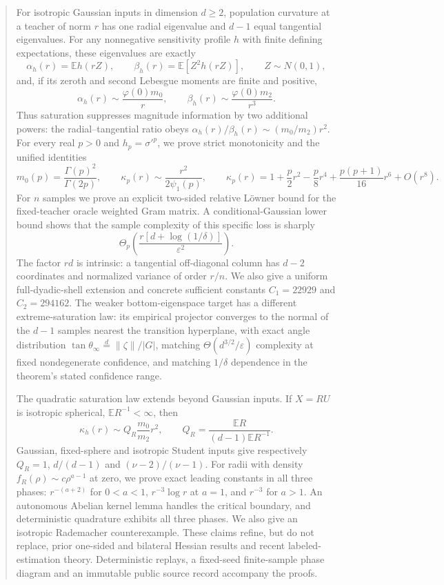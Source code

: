 \documentclass[11pt]{article}
\newcommand{\E}{\mathbb E}
\begin{document}
\begin{abstract}
For isotropic Gaussian inputs in dimension $d\ge2$, population curvature at a teacher of norm $r$ has one radial
eigenvalue and $d-1$ equal tangential eigenvalues.  For any nonnegative sensitivity profile $h$ with finite defining expectations, these
eigenvalues are exactly
\[
 \alpha_h(r)=\E h(rZ),\qquad \beta_h(r)=\E[Z^2h(rZ)],\qquad Z\sim N(0,1),
\]
and, if its zeroth and second Lebesgue moments are finite and positive,
\[
 \alpha_h(r)\sim \frac{\varphi(0)m_0}{r},\qquad
 \beta_h(r)\sim \frac{\varphi(0)m_2}{r^3}.
\]
Thus saturation suppresses magnitude information by two additional powers: the radial--tangential ratio obeys
$\alpha_h(r)/\beta_h(r)\sim(m_0/m_2)r^2$.  For every real $p>0$ and
$h_p=\sigma'^p$, we prove strict monotonicity and the unified identities
\[
 m_0(p)=\frac{\Gamma(p)^2}{\Gamma(2p)},\qquad
 \kappa_p(r)\sim\frac{r^2}{2\psi_1(p)},\qquad
 \kappa_p(r)=1+\frac p2r^2-\frac p8r^4+\frac{p(p+1)}{16}r^6+O(r^8).
\]
For $n$ samples we prove an explicit two-sided relative L\"owner bound for the fixed-teacher oracle weighted
Gram matrix.  A conditional-Gaussian lower bound shows that the sample complexity of this specific loss is sharply
\[
 \Theta_p\!\left(\frac{r[d+\log(1/\delta)]}{\varepsilon^2}\right).
\]
The factor $rd$ is intrinsic: a tangential off-diagonal column has $d-2$ coordinates and normalized variance of
order $r/n$.  We also give a uniform full-dyadic-shell extension and concrete sufficient constants
$C_1=22929$ and $C_2=294162$.  The weaker bottom-eigenspace target has a different extreme-saturation law:
its empirical projector converges to the normal of the $d-1$ samples nearest the transition hyperplane, with exact
angle distribution $\tan\theta_\infty\stackrel d=\lVert\zeta\rVert/|G|$, matching
$\Theta(d^{3/2}/\varepsilon)$ complexity at fixed nondegenerate confidence, and matching $1/\delta$ dependence
in the theorem's stated confidence range.

The quadratic saturation law extends beyond Gaussian inputs.  If $X=RU$ is isotropic spherical,
$\E R^{-1}<\infty$, then
\[
 \kappa_h(r)\sim Q_R\frac{m_0}{m_2}r^2,\qquad
 Q_R=\frac{\E R}{(d-1)\E R^{-1}}.
\]
Gaussian, fixed-sphere and isotropic Student inputs give respectively $Q_R=1$, $d/(d-1)$ and
$(\nu-2)/(\nu-1)$.  For radii with density $f_R(\rho)\sim c\rho^{a-1}$ at zero, we prove exact leading constants
in all three phases: $r^{-(a+2)}$ for $0<a<1$, $r^{-3}\log r$ at $a=1$, and $r^{-3}$ for $a>1$.
An autonomous Abelian kernel lemma handles the critical boundary, and deterministic quadrature exhibits all
three phases.  We also give an isotropic Rademacher counterexample.  These claims refine, but do not replace, prior one-sided and
bilateral Hessian results and recent labeled-estimation theory.  Deterministic replays, a fixed-seed finite-sample
phase diagram and an immutable public source record accompany the proofs.
\end{abstract}
\end{document}
